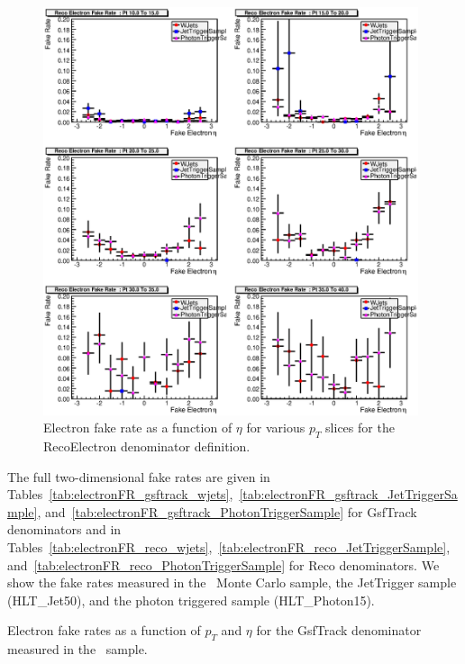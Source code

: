 \documentclass{cmspaper}
\begin{document}
\begin{figure}[htb]
\begin{center}
\includegraphics[width=0.98\textwidth]{plots/RecoElectronFakeRatePtSlices.eps}
   \caption{Electron fake rate as a function of $\eta$ for various $p_T$ slices for the RecoElectron denominator definition. }
   \label{fig:electronFR_reco_ptslices}
\end{center}
\end{figure}

The full two-dimensional fake rates are given in Tables~\ref{tab:electronFR_gsftrack_wjets},~\ref{tab:electronFR_gsftrack_JetTriggerSample}, and~\ref{tab:electronFR_gsftrack_PhotonTriggerSample} for GsfTrack denominators and in Tables~\ref{tab:electronFR_reco_wjets},~\ref{tab:electronFR_reco_JetTriggerSample}, and~\ref{tab:electronFR_reco_PhotonTriggerSample} for Reco denominators. We show the fake rates measured in the \WPlusJets\ Monte Carlo sample, the JetTrigger sample (HLT\_Jet50), and the photon triggered sample (HLT\_Photon15).

\begin{table}[ht]
  \begin{center}
    
  \end{center}
  \caption{\label{tab:electronFR_gsftrack_wjets} Electron fake rates as a function of $p_T$ and $\eta$ for the GsfTrack denominator measured in the \WPlusJets\ sample.}
\end{table}
\end{document}
